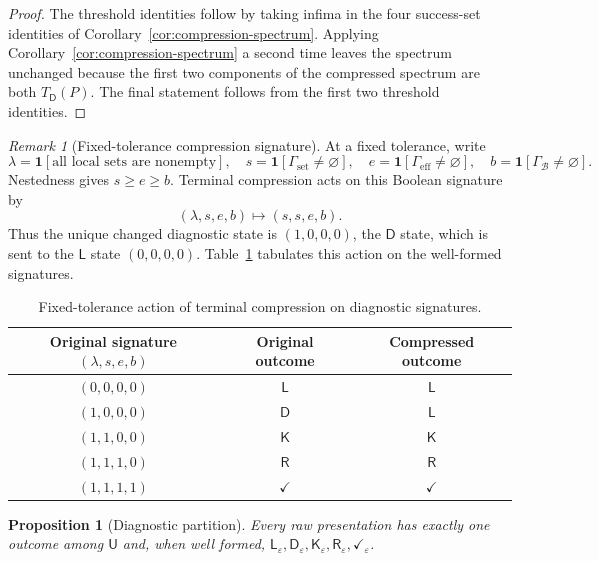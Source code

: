 \documentclass[11pt]{article}
\theoremstyle{plain}
\newtheorem{proposition}[theorem]{Proposition}
\theoremstyle{definition}
\theoremstyle{remark}
\newtheorem{remark}[theorem]{Remark}
\newcommand{\eps}{\varepsilon}
\begin{document}
\begin{proof}
The threshold identities follow by taking infima in the four success-set
identities of Corollary~\ref{cor:compression-spectrum}. Applying
Corollary~\ref{cor:compression-spectrum} a second time leaves the spectrum
unchanged because the first two components of the compressed spectrum are both
$T_{\mathsf D}(P)$. The final statement follows from the first two threshold
identities.
\end{proof}

\begin{remark}[Fixed-tolerance compression signature]
At a fixed tolerance, write
\[
\lambda=\mathbf 1[\text{all local sets are nonempty}],\quad
s=\mathbf 1[\Gamma_{\mathrm{set}}\ne\varnothing],\quad
e=\mathbf 1[\Gamma_{\mathrm{eff}}\ne\varnothing],\quad
b=\mathbf 1[\Gamma_{\mathcal B}\ne\varnothing].
\]
Nestedness gives $s\ge e\ge b$. Terminal compression acts on this Boolean
signature by
\[
(\lambda,s,e,b)\longmapsto(s,s,e,b).
\]
Thus the unique changed diagnostic state is
$(1,0,0,0)$, the $\mathsf D$ state, which is sent to the $\mathsf L$ state
$(0,0,0,0)$. Table~\ref{tab:compression-signature} tabulates this action on
the well-formed signatures.
\end{remark}

\begin{table}[htbp]
\centering
\caption{Fixed-tolerance action of terminal compression on diagnostic signatures.}
\label{tab:compression-signature}
\begin{tabular}{@{}c c c@{}}
\toprule
Original signature $(\lambda,s,e,b)$ & Original outcome & Compressed outcome\\
\midrule
$(0,0,0,0)$ & $\mathsf L$ & $\mathsf L$\\
$(1,0,0,0)$ & $\mathsf D$ & $\mathsf L$\\
$(1,1,0,0)$ & $\mathsf K$ & $\mathsf K$\\
$(1,1,1,0)$ & $\mathsf R$ & $\mathsf R$\\
$(1,1,1,1)$ & $\checkmark$ & $\checkmark$\\
\bottomrule
\end{tabular}
\end{table}

\begin{proposition}[Diagnostic partition]\label{prop:diagnostic}
Every raw presentation has exactly one outcome among
$\mathsf U$ and, when well formed,
$\mathsf L_\eps,\mathsf D_\eps,\mathsf K_\eps,
\mathsf R_\eps,\checkmark_\eps$.
\end{proposition}
\end{document}
